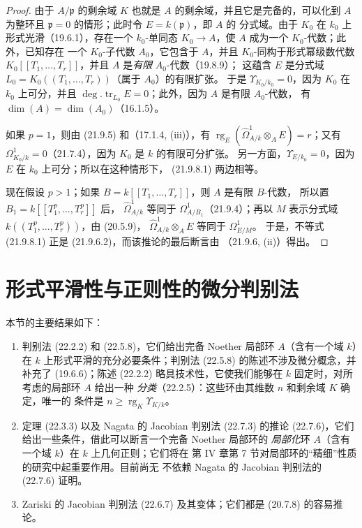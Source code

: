 \begin{proof}
由于 $A/\mathfrak p$ 的剩余域 $K$ 也就是 $A$ 的剩余域，并且它是完备的，可以化到
$A$ 为整环且 $\mathfrak p=0$ 的情形；此时令 $E=k(\mathfrak p)$，即 $A$ 的
分式域。由于 $K_0$ 在 $k_0$ 上形式光滑（19.6.1），存在一个
$k_0$-单同态 $K_0\to A$，使 $A$ 成为一个 $K_0$-代数；此外，已知存在
一个 $K_0$-子代数 $A_0$，它包含于 $A$，并且 $K_0$-同构于形式幂级数代数
$K_0[[T_1,\ldots,T_r]]$，并且 $A$ 是\emph{有限} $A_0$-代数（19.8.9）；
这蕴含 $E$ 是分式域 $L_0=K_0((T_1,\ldots,T_r))$（属于 $A_0$）的有限扩张。
于是 $\Upsilon_{K_0/k_0}=0$，因为 $K_0$ 在 $k_0$ 上可分，并且
$\deg.\operatorname{tr}_{L_0}E=0$；此外，因为 $A$ 是有限 $A_0$-代数，
有 $\dim(A)=\dim(A_0)$（16.1.5）。

如果 $p=1$，则由 (21.9.5) 和（17.1.4, (iii)），有
$\operatorname{rg}_E(\widehat\Omega^1_{A/k}\otimes_AE)=r$；又有
$\Omega^1_{K_0/k}=0$（21.7.4），因为 $K_0$ 是 $k$ 的有限可分扩张。
另一方面，$\Upsilon_{E/k_0}=0$，因为 $E$ 在 $k_0$ 上可分；所以在这种情形下，
(21.9.8.1) 两边相等。

现在假设 $p>1$；如果 $B=k[[T_1,\ldots,T_r]]$，则 $A$ 是有限 $B$-代数，
所以置 $B_1=k[[T_1^p,\ldots,T_r^p]]$ 后，
$\widehat\Omega^1_{A/k}$ 等同于 $\Omega^1_{A/B_1}$（21.9.4）；再以 $M$
表示分式域 $k((T_1^p,\ldots,T_r^p))$，由 (20.5.9)，
$\widehat\Omega^1_{A/k}\otimes_AE$ 等同于 $\Omega^1_{E/M}$。
于是，不等式 (21.9.8.1) 正是 (21.9.6.2)，而该推论的最后断言由
（21.9.6, (ii)）得出。
\end{proof}

\section{形式平滑性与正则性的微分判别法}
\label{section:0.22-fr}

本节的主要结果如下：
\begin{enumerate}
  \item[a)] 判别法 (22.2.2) 和 (22.5.8)，它们给出完备 Noether 局部环
  $A$（含有一个域 $k$）在 $k$ 上形式平滑的充分必要条件；判别法
  (22.5.8) 的陈述不涉及微分概念，并补充了 (19.6.6)；陈述 (22.2.2)
  略具技术性，它使我们能够在 $k$ 固定时，对所考虑的局部环 $A$ 给出一种
  \emph{分类}（22.2.5）：这些环由其维数 $n$ 和剩余域 $K$ 确定，唯一的
  条件是
  $n\geqslant\operatorname{rg}_K\Upsilon_{K/k}$。

  \item[b)] 定理 (22.3.3) 以及 Nagata 的 Jacobian 判别法 (22.7.3) 的推论
  (22.7.6)，它们给出一些条件，借此可以断言一个完备 Noether 局部环的
  \emph{局部化}环 $A$（含有一个域 $k$）在 $k$ 上几何正则；它们将在
  第 IV 章第 7 节对局部环的“精细”性质的研究中起重要作用。目前尚无
  不依赖 Nagata 的 Jacobian 判别法的 (22.7.6) 证明。

  \item[c)] Zariski 的 Jacobian 判别法 (22.6.7) 及其变体；它们都是
  (20.7.8) 的容易推论。
\end{enumerate}

